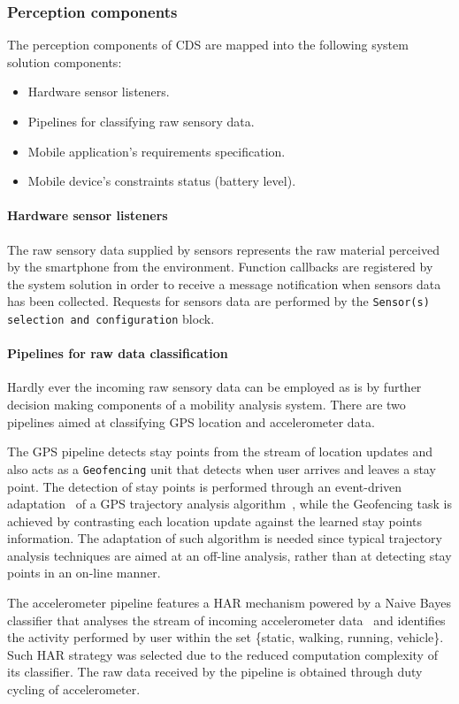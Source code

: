 \documentclass[ENG,PhD]{cinvestav}
\begin{document}
\subsubsection{Perception components}
The perception components of CDS are mapped into the following system solution components:
\begin{itemize}
  \item Hardware sensor listeners.
  \item Pipelines for classifying raw sensory data.
  \item Mobile application's requirements specification.
  \item Mobile device's constraints status (battery level).
\end{itemize}

\paragraph*{Hardware sensor listeners}
The raw sensory data supplied by sensors represents the raw material perceived by the smartphone from the environment.
Function callbacks are registered by the system solution in order to receive a message notification when sensors data has been collected.
Requests for sensors data are performed by the \texttt{Sensor(s) selection and configuration} block.

\paragraph*{Pipelines for raw data classification}
Hardly ever the incoming raw sensory data can be employed as is by further decision making components of a mobility analysis system.
There are two pipelines aimed at classifying GPS location and accelerometer data. 

The GPS pipeline detects stay points from the stream of location updates and also acts as a \texttt{Geofencing} unit that detects when user arrives and leaves a stay point.
The detection of stay points is performed through an event-driven adaptation~\cite{Perez-Torres2016b} of a GPS trajectory analysis algorithm~\cite{Li2008,Ye2009}, while the Geofencing task is achieved by contrasting each location update against the learned stay points information.
The adaptation of such algorithm is needed since typical trajectory analysis techniques are aimed at an off-line analysis, rather than at detecting stay points in an on-line manner.

The accelerometer pipeline features a HAR mechanism powered by a Naive Bayes classifier that analyses the stream of incoming accelerometer data~\cite{Torres-Huitzil2015} and identifies the activity performed by user within the set \{static, walking, running, vehicle\}.
Such HAR strategy was selected due to the reduced computation complexity of its classifier.
The raw data received by the pipeline is obtained through duty cycling of accelerometer.
\end{document}
